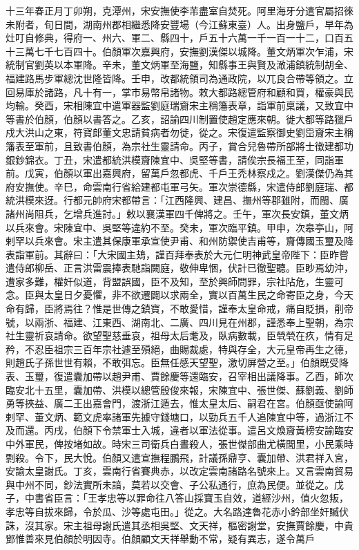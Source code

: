 
\begin{pinyinscope}

 十三年春正月丁卯朔，克潭州，宋安撫使李芾盡室自焚死。阿里海牙分遣官屬招徠未附者，旬日間，湖南州郡相繼悉降安豐場（今江蘇東臺）人。出身鹽戶，早年為灶叮自修典，得府一、州六、軍二、縣四十，戶五十六萬一千一百一十二，口百五十三萬七千七百四十。伯顏軍次嘉興府，安撫劉漢傑以城降。董文炳軍次乍浦，宋統制官劉英以本軍降。辛未，董文炳軍至海鹽，知縣事王與賢及澉浦鎮統制胡全、福建路馬步軍總沈世隆皆降。壬申，改都統領司為通政院，以兀良合帶等領之。立回易庫於諸路，凡十有一，掌市易幣帛諸物。敕大都路總管府和顧和買，權豪與民均輸。癸酉，宋相陳宜中遣軍器監劉庭瑞齎宋主稱籓表章，詣軍前稟議，又致宜中等書於伯顏，伯顏以書答之。乙亥，詔諭四川制置使趙定應來朝。徙大都等路獵戶戍大洪山之東，符寶郎董文忠請貧病者勿徙，從之。宋復遣監察御史劉岊齎宋主稱籓表至軍前，且致書伯顏，為宗社生靈請命。丙子，賞合兒魯帶所部將士徵建都功銀鈔錦衣。丁丑，宋遣都統洪模齎陳宜中、吳堅等書，請俟宗長福王至，同詣軍前。戊寅，伯顏以軍出嘉興府，留萬戶忽都虎、千戶王禿林察戍之。劉漢傑仍為其府安撫使。辛巳，命雲南行省給建都屯軍弓矢。軍次崇德縣，宋遣侍郎劉庭瑞、都統洪模來迓。行都元帥府宋都帶言：「江西隆興、建昌、撫州等郡雖附，而閩、廣諸州尚阻兵，乞增兵進討。」敕以襄漢軍四千俾將之。壬午，軍次長安鎮，董文炳以兵來會。宋陳宜中、吳堅等違約不至。癸未，軍次臨平鎮。甲申，次皋亭山，阿剌罕以兵來會。宋主遣其保康軍承宣使尹甫、和州防禦使吉甫等，齎傳國玉璽及降表詣軍前。其辭曰：「大宋國主鳷，謹百拜奉表於大元仁明神武皇帝陛下：臣昨嘗遣侍郎柳岳、正言洪雷震捧表馳詣闕庭，敬伸卑悃，伏計已徹聖聽。臣眇焉幼沖，遭家多難，權奸似道，背盟誤國，臣不及知，至於興師問罪，宗社阽危，生靈可念。臣與太皇日夕憂懼，非不欲遷闢以求兩全，實以百萬生民之命寄臣之身，今天命有歸，臣將焉往？惟是世傳之鎮寶，不敢愛惜，謹奉太皇命戒，痛自貶損，削帝號，以兩浙、福建、江東西、湖南北、二廣、四川見在州郡，謹悉奉上聖朝，為宗社生靈祈哀請命。欲望聖慈垂哀，祖母太后耄及，臥病數載，臣煢煢在疚，情有足矜，不忍臣祖宗三百年宗社遽至殞絕，曲賜裁處，特與存全，大元皇帝再生之德，則趙氏子孫世世有賴，不敢弭忘。臣無任感天望聖，激切屏營之至。」伯顏既受降表、玉璽，復遣囊加帶以趙尹甫、賈餘慶等還臨安，召宰相出議降事。乙酉，師次臨安北十五里，囊加帶、洪模以總管殷俊來報，宋陳宜中、張世傑、蘇劉義、劉師勇等挾益、廣二王出嘉會門，渡浙江遁去，惟太皇太后、嗣君在宮。伯顏亟使諭阿剌罕、董文炳、範文虎率諸軍先據守錢塘口，以勁兵五千人追陳宜中等，過浙江不及而還。丙戌，伯顏下令禁軍士入城，違者以軍法從事。遣呂文煥齎黃榜安諭臨安中外軍民，俾按堵如故。時宋三司衛兵白晝殺人，張世傑部曲尤橫閭里，小民乘時剽殺。令下，民大悅。伯顏又遣宣撫程鵬飛，計議孫鼎亨、囊加帶、洪君祥入宮，安諭太皇謝氏。丁亥，雲南行省賽典赤，以改定雲南諸路名號來上。又言雲南貿易與中州不同，鈔法實所未諳，莫若以交會、子公私通行，庶為民便。並從之。戊子，中書省臣言：「王孝忠等以罪命往八答山採寶玉自效，道經沙州，值火忽叛，孝忠等自拔來歸，令於瓜、沙等處屯田。」從之。大名路達魯花赤小鈐部坐奸贓伏誅，沒其家。宋主祖母謝氏遣其丞相吳堅、文天祥，樞密謝堂，安撫賈餘慶，中貴鄧惟善來見伯顏於明因寺。伯顏顧文天祥舉動不常，疑有異志，遂令萬戶
\end{pinyinscope}
